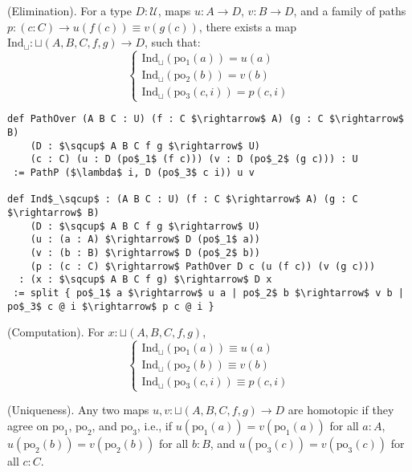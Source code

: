 \begin{theorem} (Elimination).
For a type \( D : \mathcal{U} \), maps \( u : A \to D \), \( v : B \to D \),
and a family of paths \( p : (c : C) \to u(f(c)) \equiv v(g(c)) \),
there exists a map \( \text{Ind}_\sqcup : \sqcup(A,B,C,f,g) \to D \), such that:
\[
\begin{cases}
\text{Ind}_\sqcup(\text{po$_1$}(a)) = u(a) \\
\text{Ind}_\sqcup(\text{po$_2$}(b)) = v(b) \\
\text{Ind}_\sqcup(\text{po$_3$}(c,i)) = p(c,i)
\end{cases}
\]
\begin{lstlisting}[mathescape=true]
def PathOver (A B C : U) (f : C $\rightarrow$ A) (g : C $\rightarrow$ B)
    (D : $\sqcup$ A B C f g $\rightarrow$ U)
    (c : C) (u : D (po$_1$ (f c))) (v : D (po$_2$ (g c))) : U
 := PathP ($\lambda$ i, D (po$_3$ c i)) u v

def Ind$_\sqcup$ : (A B C : U) (f : C $\rightarrow$ A) (g : C $\rightarrow$ B)
    (D : $\sqcup$ A B C f g $\rightarrow$ U)
    (u : (a : A) $\rightarrow$ D (po$_1$ a))
    (v : (b : B) $\rightarrow$ D (po$_2$ b))
    (p : (c : C) $\rightarrow$ PathOver D c (u (f c)) (v (g c)))
  : (x : $\sqcup$ A B C f g) $\rightarrow$ D x
 := split { po$_1$ a $\rightarrow$ u a | po$_2$ b $\rightarrow$ v b | po$_3$ c @ i $\rightarrow$ p c @ i }
\end{lstlisting}
\end{theorem}

\begin{theorem} (Computation).
For \( x : \sqcup(A,B,C,f,g) \),
\[
\begin{cases}
\text{Ind$_\sqcup$}(\text{po$_1$}(a)) \equiv u(a) \\
\text{Ind$_\sqcup$}(\text{po$_2$}(b)) \equiv v(b) \\
\text{Ind$_\sqcup$}(\text{po$_3$}(c,i)) \equiv p(c,i)
\end{cases}
\]
\end{theorem}

\begin{theorem} (Uniqueness).
Any two maps \( u, v : \sqcup(A,B,C,f,g) \to D \) are homotopic
if they agree on \( \text{po}_1 \), \( \text{po}_2 \), and \( \text{po}_3 \), i.e.,
if \( u(\text{po}_1(a)) = v(\text{po}_1(a)) \) for all \( a : A \), \( u(\text{po}_2(b)) = v(\text{po}_2(b)) \)
for all \( b : B \), and \( u(\text{po}_3(c)) = v(\text{po}_3(c)) \) for all \( c : C \).
\end{theorem}

